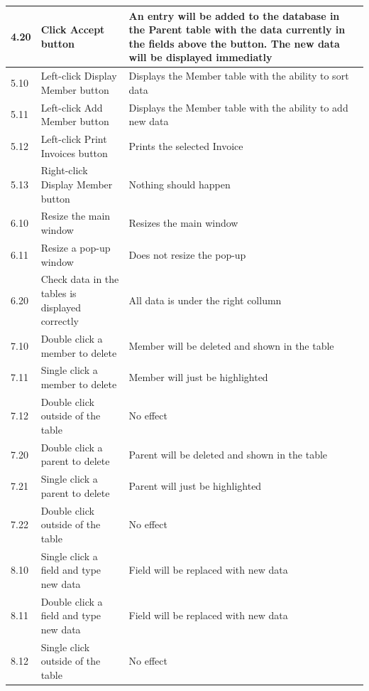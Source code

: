 \begin{landscape}
\begin{center}
\begin{longtable}{|p{2cm}|p{5cm}|p{8cm}|}
        4.20 & Click Accept button & An entry will be added to the database in the Parent table with the data currently in the fields above the button. The new data will be displayed immediatly \\ \hline
        
        5.10 & Left-click Display Member button & Displays the Member table with the ability to sort data \\ \hline
        5.11 & Left-click Add Member button & Displays the Member table with the ability to add new data \\ \hline
        5.12 & Left-click Print Invoices button & Prints the selected Invoice \\ \hline
        5.13 & Right-click Display Member button & Nothing should happen \\ \hline
        
        6.10 & Resize the main window & Resizes the main window \\ \hline
        6.11 & Resize a pop-up window & Does not resize the pop-up\\ \hline
        
        6.20 & Check data in the tables is displayed correctly & All data is under the right collumn \\ \hline

       \rowcolor{lightgrey} 7.10 & Double click a member to delete & Member will be deleted and shown in the table \\ \hline
       \rowcolor{lightgrey} 7.11 & Single click a member to delete & Member will just be highlighted \\ \hline
       \rowcolor{lightgrey} 7.12 & Double click outside of the table & No effect \\ \hline

       \rowcolor{lightgrey} 7.20 & Double click a parent to delete & Parent will be deleted and shown in the table \\ \hline
       \rowcolor{lightgrey} 7.21 & Single click a parent to delete & Parent will just be highlighted \\ \hline
       \rowcolor{lightgrey} 7.22 & Double click outside of the table & No effect \\ \hline
        
       \rowcolor{lightgrey} 8.10 & Single click a field and type new data & Field will be replaced with new data \\ \hline
       \rowcolor{lightgrey} 8.11 & Double click a field and type new data & Field will be replaced with new data \\ \hline
       \rowcolor{lightgrey} 8.12 & Single click outside of the table & No effect \\ \hline
        

\end{longtable}
\end{center}
\end{landscape}
